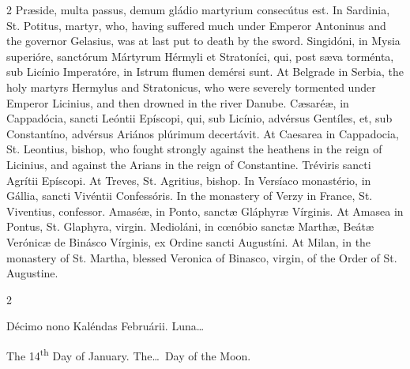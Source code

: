 \begin{paracol}{2}
 Præside, multa passus, demum gládio martyrium 
 consecútus est.
\switchcolumn
{}
In Sardinia, St. Potitus, martyr, who, having suffered much under Emperor 
 Antoninus and the governor Gelasius, was at last put to death by the sword.
\switchcolumn*
{}
Singidóni, in Mysia superióre, sanctórum 
 Mártyrum Hérmyli et Stratoníci, qui, post sæva torménta, sub Licínio 
 Imperatóre, in Istrum flumen demérsi sunt.
\switchcolumn
{}
At Belgrade in Serbia, the holy martyrs Hermylus and Stratonicus, who were 
 severely tormented under Emperor Licinius, and then drowned in the river 
 Danube.
\switchcolumn*
{}
Cæsaréæ, in Cappadócia, sancti Leóntii Epíscopi, 
 qui, sub Licínio, advérsus Gentíles, et, sub Constantíno, advérsus Ariános 
 plúrimum decertávit.
\switchcolumn
{}
At Caesarea in Cappadocia, St. Leontius, bishop, who fought strongly against 
 the heathens in the reign of Licinius, and against the Arians in the reign 
 of Constantine.
\switchcolumn*
{}
Tréviris sancti Agrítii Epíscopi.
\switchcolumn
{}
At Treves, St. Agritius, bishop.
\switchcolumn*
{}
In Versíaco monastério, in Gállia, sancti 
 Vivéntii Confessóris.
\switchcolumn
{}
In the monastery of Verzy in France, St. Viventius, confessor.
\switchcolumn*
{}
Amaséæ, in Ponto, sanctæ Gláphyræ Vírginis.
\switchcolumn
{}
At Amasea in Pontus, St. Glaphyra, virgin.
\switchcolumn*
{}
Medioláni, in cœnóbio sanctæ Marthæ, Beátæ 
 Verónicæ de Binásco Vírginis, ex Ordine sancti Augustíni.
\switchcolumn
{}
At Milan, in the monastery of St. Martha, blessed Veronica of Binasco, 
 virgin, of the Order of St. Augustine.
\switchcolumn*
{}
\end{paracol}


\begin{paracol}{2}
\begin{center}{\color{gregoriocolor} Décimo nono Kaléndas Februárii. 
 Luna\dots\ }\end{center}
\switchcolumn
{}
\begin{center}{\color{gregoriocolor} The 14\textsuperscript{th} Day of 
 January. The\dots\ Day of the Moon.}\end{center}
\end{paracol}

